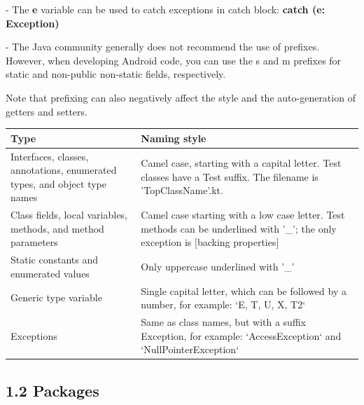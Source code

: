 {{{{- The \textbf{e} variable can be used to catch exceptions in catch block: \textbf{catch (e: Exception) {}}

- The Java community generally does not recommend the use of prefixes. However, when developing Android code, you can use the s and m prefixes for static and non-public non-static fields, respectively.

Note that prefixing can also negatively affect the style and the auto-generation of getters and setters.



\begin{center}

\begin{tabular}{ |p{7.5cm}|p{7.5cm}| }

\hline

Type&Naming style\\

\hline

 Interfaces, classes, annotations, enumerated types, and object type names & Camel case, starting with a capital letter. Test classes have a Test suffix. The filename is 'TopClassName'.kt.  \\

 Class fields, local variables, methods, and method parameters & Camel case starting with a low case letter. Test methods can be underlined with '\_'; the only exception is [backing properties]\\

 Static constants and enumerated values & Only uppercase underlined with '\_' \\

 Generic type variable & Single capital letter, which can be followed by a number, for example: `E, T, U, X, T2` \\

 Exceptions & Same as class names, but with a suffix Exception, for example: `AccessException` and `NullPointerException`\\

\hline

\end{tabular}

\end{center}

\subsection*{\textbf{1.2 Packages}}

\label{sec:1.2}



}}}}
